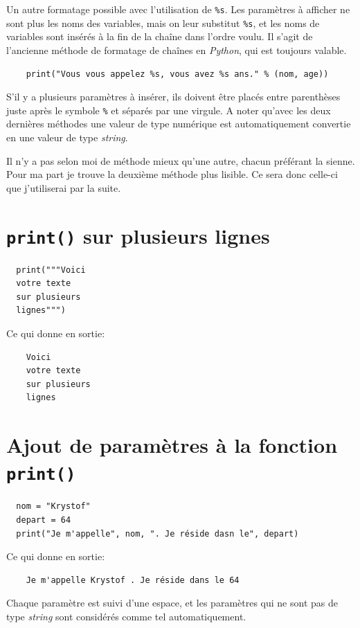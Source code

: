 \documentclass[a4paper,11pt]{book}
\begin{document}
Un autre formatage possible avec l'utilisation de \texttt{\%s}. Les paramètres à afficher ne sont plus les noms des variables, mais on leur substitut \texttt{\%s}, et les noms de variables sont insérés à la fin de la chaîne dans l'ordre voulu. Il s'agit de l'ancienne méthode de formatage de chaînes en \textit{Python}, qui est toujours valable.
\begin{verbatim}
    print("Vous vous appelez %s, vous avez %s ans." % (nom, age))
\end{verbatim}
\medskip

S'il y a plusieurs paramètres à insérer, ils doivent être placés entre parenthèses juste après le symbole \texttt{\%} et séparés par une virgule. A noter qu'avec les deux dernières méthodes une valeur de type numérique est automatiquement convertie en une valeur de type \textit{string}.
\medskip

Il n'y a pas selon moi de méthode mieux qu'une autre, chacun préférant la sienne. Pour ma part je trouve la deuxième méthode plus lisible. Ce sera donc celle-ci que j'utiliserai par la suite.
\medskip

\section{\texttt{print()} sur plusieurs lignes}
\begin{lstlisting}
  print("""Voici
  votre texte
  sur plusieurs
  lignes""")
\end{lstlisting}
\medskip

Ce qui donne en sortie:
\begin{verbatim}
    Voici
    votre texte
    sur plusieurs
    lignes
\end{verbatim}
\medskip

\section{Ajout de paramètres à la fonction \texttt{print()}}
\begin{lstlisting}
  nom = "Krystof"
  depart = 64
  print("Je m'appelle", nom, ". Je réside dasn le", depart)
\end{lstlisting}
\medskip

Ce qui donne en sortie:
\begin{verbatim}
    Je m'appelle Krystof . Je réside dans le 64
\end{verbatim}
\medskip

Chaque paramètre est suivi d'une espace, et les paramètres qui ne sont pas de type \textit{string} sont considérés comme tel automatiquement.
\medskip
\end{document}
